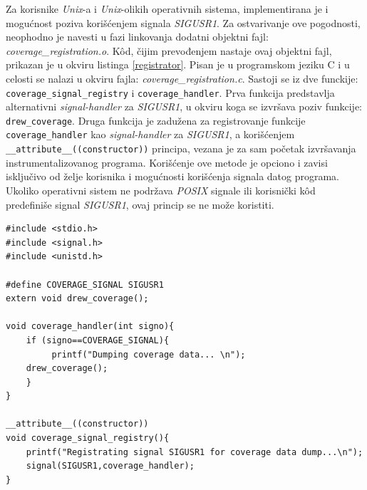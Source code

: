 \documentclass[12pt,oneside]{memoir}
\newcommand{\kod}[1]{\texttt{#1}}
\newcommand{\strano}[1]{\textit{#1}}
\begin{document}
Za korisnike \strano{Unix}-a i \strano{Unix}-olikih operativnih sistema, implementirana je i mogućnost poziva korišćenjem signala \strano{SIGUSR1}. Za ostvarivanje ove pogodnosti, neophodno je navesti u fazi linkovanja dodatni objektni fajl: \strano{coverage\_registration.o}. K\^{o}d, čijim prevođenjem nastaje ovaj objektni fajl, prikazan je u okviru listinga \ref{registrator}. Pisan je u programskom jeziku C i u celosti se nalazi u okviru fajla:  \strano{coverage\_registration.c}. Sastoji se iz dve funckije: \kod{coverage\_signal\_registry} i \kod{coverage\_handler}. Prva funkcija predstavlja alternativni \strano{signal-handler} za \strano{SIGUSR1}, u okviru koga se izvršava poziv funkcije: \kod{drew\_coverage}. Druga funkcija je zadužena za registrovanje funkcije \kod{coverage\_handler} kao \strano{signal-handler} za \strano{SIGUSR1}, a korišćenjem \kod{\_\_attribute\_\_((constructor))} principa, vezana je za sam početak izvršavanja instrumentalizovanog programa. 
Korišćenje ove metode je opciono i zavisi isključivo od želje korisnika i mogućnosti korišćenja signala datog programa. Ukoliko operativni sistem ne podržava \strano{POSIX} signale ili korisnički k\^{o}d predefiniše signal \strano{SIGUSR1}, ovaj princip se ne može koristiti.

\newpage

\begin{lstlisting}[caption={Izvorni k\^{o}d u okviru fajla: \strano{coverage\_registration.c}},frame=single, label=registrator]
#include <stdio.h>                                                       
#include <signal.h>                                                      
#include <unistd.h>     

#define COVERAGE_SIGNAL SIGUSR1
extern void drew_coverage();

void coverage_handler(int signo){
    if (signo==COVERAGE_SIGNAL){
         printf("Dumping coverage data... \n");
    drew_coverage();
    }
}

__attribute__((constructor))
void coverage_signal_registry(){
    printf("Registrating signal SIGUSR1 for coverage data dump...\n");
    signal(SIGUSR1,coverage_handler);
}
\end{lstlisting}
\end{document}
